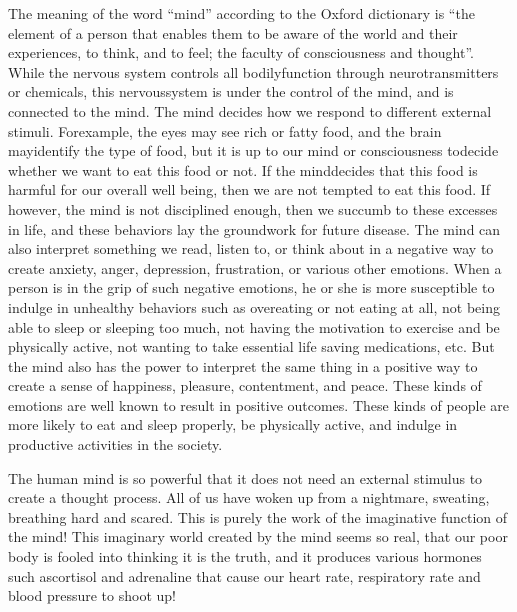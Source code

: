 The meaning of the word “mind” according to the Oxford dictionary is “the element of a person that enables them to be aware of the world and their experiences, to think, and to feel; the faculty of consciousness and thought”. While the nervous system controls all bodily\break function through neurotransmitters or chemicals, this nervous\break system is under the control of the mind, and is connected to the mind. The mind decides how we respond to different external stimuli. For\break example, the eyes may see rich or fatty food, and the brain may\break identify the type of food, but it is up to our mind or consciousness to\break decide whether we want to eat this food or not. If the mind\break decides that this food is harmful for our overall well being, then we are not tempted to eat this food. If however, the mind is not disciplined enough, then we succumb to these excesses in life, and these behaviors lay the groundwork for future disease. The mind can also interpret something we read, listen to, or think about in a negative way to create anxiety, anger, depression, frustration, or various other emotions. When a person is in the grip of such negative emotions, he or she is more susceptible to indulge in unhealthy behaviors such as overeating or not eating at all, not being able to sleep or sleeping too much, not having the motivation to exercise and be physically active, not wanting to take essential life saving medications, etc. But the mind also has the power to interpret the same thing in a positive way to create a sense of happiness, pleasure, contentment, and peace. These kinds of emotions are well known to result in positive outcomes. These kinds of people are more likely to eat and sleep properly, be physically active, and indulge in productive activities in the society.

The human mind is so powerful that it does not need an external stimulus to create a thought process. All of us have woken up from a nightmare, sweating, breathing hard and scared. This is purely the work of the imaginative function of the mind! This imaginary world created by the mind seems so real, that our poor body is fooled into thinking it is the truth, and it produces various hormones such as\break cortisol and adrenaline that cause our heart rate, respiratory rate and blood pressure to shoot up!

